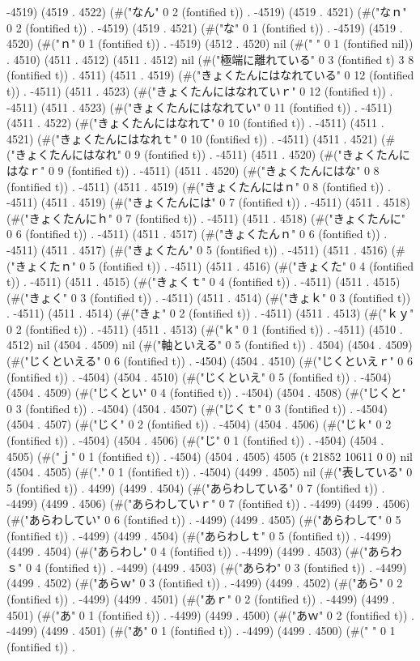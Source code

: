 -4519) (4519 . 4522) (#("なん" 0 2 (fontified t)) . -4519) (4519 . 4521) (#("なｎ" 0 2 (fontified t)) . -4519) (4519 . 4521) (#("な" 0 1 (fontified t)) . -4519) (4519 . 4520) (#("ｎ" 0 1 (fontified t)) . -4519) (4512 . 4520) nil (#(" " 0 1 (fontified nil)) . 4510) (4511 . 4512) (4511 . 4512) nil (#("極端に離れている" 0 3 (fontified t) 3 8 (fontified t)) . 4511) (4511 . 4519) (#("きょくたんにはなれている" 0 12 (fontified t)) . -4511) (4511 . 4523) (#("きょくたんにはなれていｒ" 0 12 (fontified t)) . -4511) (4511 . 4523) (#("きょくたんにはなれてい" 0 11 (fontified t)) . -4511) (4511 . 4522) (#("きょくたんにはなれて" 0 10 (fontified t)) . -4511) (4511 . 4521) (#("きょくたんにはなれｔ" 0 10 (fontified t)) . -4511) (4511 . 4521) (#("きょくたんにはなれ" 0 9 (fontified t)) . -4511) (4511 . 4520) (#("きょくたんにはなｒ" 0 9 (fontified t)) . -4511) (4511 . 4520) (#("きょくたんにはな" 0 8 (fontified t)) . -4511) (4511 . 4519) (#("きょくたんにはｎ" 0 8 (fontified t)) . -4511) (4511 . 4519) (#("きょくたんには" 0 7 (fontified t)) . -4511) (4511 . 4518) (#("きょくたんにｈ" 0 7 (fontified t)) . -4511) (4511 . 4518) (#("きょくたんに" 0 6 (fontified t)) . -4511) (4511 . 4517) (#("きょくたんｎ" 0 6 (fontified t)) . -4511) (4511 . 4517) (#("きょくたん" 0 5 (fontified t)) . -4511) (4511 . 4516) (#("きょくたｎ" 0 5 (fontified t)) . -4511) (4511 . 4516) (#("きょくた" 0 4 (fontified t)) . -4511) (4511 . 4515) (#("きょくｔ" 0 4 (fontified t)) . -4511) (4511 . 4515) (#("きょく" 0 3 (fontified t)) . -4511) (4511 . 4514) (#("きょｋ" 0 3 (fontified t)) . -4511) (4511 . 4514) (#("きょ" 0 2 (fontified t)) . -4511) (4511 . 4513) (#("ｋｙ" 0 2 (fontified t)) . -4511) (4511 . 4513) (#("ｋ" 0 1 (fontified t)) . -4511) (4510 . 4512) nil (4504 . 4509) nil (#("軸といえる" 0 5 (fontified t)) . 4504) (4504 . 4509) (#("じくといえる" 0 6 (fontified t)) . -4504) (4504 . 4510) (#("じくといえｒ" 0 6 (fontified t)) . -4504) (4504 . 4510) (#("じくといえ" 0 5 (fontified t)) . -4504) (4504 . 4509) (#("じくとい" 0 4 (fontified t)) . -4504) (4504 . 4508) (#("じくと" 0 3 (fontified t)) . -4504) (4504 . 4507) (#("じくｔ" 0 3 (fontified t)) . -4504) (4504 . 4507) (#("じく" 0 2 (fontified t)) . -4504) (4504 . 4506) (#("じｋ" 0 2 (fontified t)) . -4504) (4504 . 4506) (#("じ" 0 1 (fontified t)) . -4504) (4504 . 4505) (#("ｊ" 0 1 (fontified t)) . -4504) (4504 . 4505) 4505 (t 21852 10611 0 0) nil (4504 . 4505) (#("." 0 1 (fontified t)) . -4504) (4499 . 4505) nil (#("表している" 0 5 (fontified t)) . 4499) (4499 . 4504) (#("あらわしている" 0 7 (fontified t)) . -4499) (4499 . 4506) (#("あらわしていｒ" 0 7 (fontified t)) . -4499) (4499 . 4506) (#("あらわしてい" 0 6 (fontified t)) . -4499) (4499 . 4505) (#("あらわして" 0 5 (fontified t)) . -4499) (4499 . 4504) (#("あらわしｔ" 0 5 (fontified t)) . -4499) (4499 . 4504) (#("あらわし" 0 4 (fontified t)) . -4499) (4499 . 4503) (#("あらわｓ" 0 4 (fontified t)) . -4499) (4499 . 4503) (#("あらわ" 0 3 (fontified t)) . -4499) (4499 . 4502) (#("あらｗ" 0 3 (fontified t)) . -4499) (4499 . 4502) (#("あら" 0 2 (fontified t)) . -4499) (4499 . 4501) (#("あｒ" 0 2 (fontified t)) . -4499) (4499 . 4501) (#("あ" 0 1 (fontified t)) . -4499) (4499 . 4500) (#("あｗ" 0 2 (fontified t)) . -4499) (4499 . 4501) (#("あ" 0 1 (fontified t)) . -4499) (4499 . 4500) (#(" " 0 1 (fontified t)) . 
